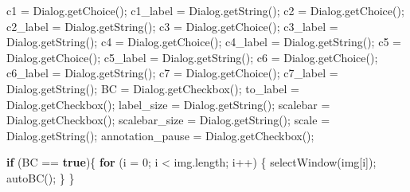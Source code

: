 \documentclass[
  12pt,
  a4paper,
]{book}
\newenvironment{Shaded}{}{}
\newcommand{\ControlFlowTok}[1]{\textcolor[rgb]{0.00,0.44,0.13}{\textbf{#1}}}
\newcommand{\DecValTok}[1]{\textcolor[rgb]{0.25,0.63,0.44}{#1}}
\newcommand{\KeywordTok}[1]{\textcolor[rgb]{0.00,0.44,0.13}{\textbf{#1}}}
\newcommand{\NormalTok}[1]{#1}
\newcommand{\OperatorTok}[1]{\textcolor[rgb]{0.40,0.40,0.40}{#1}}
\begin{document}
\begin{Shaded}
\begin{Highlighting}[]
\NormalTok{c1 }\OperatorTok{=}\NormalTok{ Dialog}\OperatorTok{.}\NormalTok{getChoice}\OperatorTok{();}
\NormalTok{c1\_label }\OperatorTok{=}\NormalTok{ Dialog}\OperatorTok{.}\NormalTok{getString}\OperatorTok{();}
\NormalTok{c2 }\OperatorTok{=}\NormalTok{ Dialog}\OperatorTok{.}\NormalTok{getChoice}\OperatorTok{();}
\NormalTok{c2\_label }\OperatorTok{=}\NormalTok{ Dialog}\OperatorTok{.}\NormalTok{getString}\OperatorTok{();}
\NormalTok{c3 }\OperatorTok{=}\NormalTok{ Dialog}\OperatorTok{.}\NormalTok{getChoice}\OperatorTok{();}
\NormalTok{c3\_label }\OperatorTok{=}\NormalTok{ Dialog}\OperatorTok{.}\NormalTok{getString}\OperatorTok{();}
\NormalTok{c4 }\OperatorTok{=}\NormalTok{ Dialog}\OperatorTok{.}\NormalTok{getChoice}\OperatorTok{();}
\NormalTok{c4\_label }\OperatorTok{=}\NormalTok{ Dialog}\OperatorTok{.}\NormalTok{getString}\OperatorTok{();}
\NormalTok{c5 }\OperatorTok{=}\NormalTok{ Dialog}\OperatorTok{.}\NormalTok{getChoice}\OperatorTok{();}
\NormalTok{c5\_label }\OperatorTok{=}\NormalTok{ Dialog}\OperatorTok{.}\NormalTok{getString}\OperatorTok{();}
\NormalTok{c6 }\OperatorTok{=}\NormalTok{ Dialog}\OperatorTok{.}\NormalTok{getChoice}\OperatorTok{();}
\NormalTok{c6\_label }\OperatorTok{=}\NormalTok{ Dialog}\OperatorTok{.}\NormalTok{getString}\OperatorTok{();}
\NormalTok{c7 }\OperatorTok{=}\NormalTok{ Dialog}\OperatorTok{.}\NormalTok{getChoice}\OperatorTok{();}
\NormalTok{c7\_label }\OperatorTok{=}\NormalTok{ Dialog}\OperatorTok{.}\NormalTok{getString}\OperatorTok{();}
\NormalTok{BC }\OperatorTok{=}\NormalTok{ Dialog}\OperatorTok{.}\NormalTok{getCheckbox}\OperatorTok{();}
\NormalTok{to\_label }\OperatorTok{=}\NormalTok{ Dialog}\OperatorTok{.}\NormalTok{getCheckbox}\OperatorTok{();}
\NormalTok{label\_size }\OperatorTok{=}\NormalTok{ Dialog}\OperatorTok{.}\NormalTok{getString}\OperatorTok{();}
\NormalTok{scalebar }\OperatorTok{=}\NormalTok{ Dialog}\OperatorTok{.}\NormalTok{getCheckbox}\OperatorTok{();}
\NormalTok{scalebar\_size }\OperatorTok{=}\NormalTok{ Dialog}\OperatorTok{.}\NormalTok{getString}\OperatorTok{();}
\NormalTok{scale }\OperatorTok{=}\NormalTok{ Dialog}\OperatorTok{.}\NormalTok{getString}\OperatorTok{();}
\NormalTok{annotation\_pause }\OperatorTok{=}\NormalTok{ Dialog}\OperatorTok{.}\NormalTok{getCheckbox}\OperatorTok{();}

\ControlFlowTok{if} \OperatorTok{(}\NormalTok{BC }\OperatorTok{==} \KeywordTok{true}\OperatorTok{)\{}
    \ControlFlowTok{for} \OperatorTok{(}\NormalTok{i }\OperatorTok{=} \DecValTok{0}\OperatorTok{;}\NormalTok{ i }\OperatorTok{\textless{}}\NormalTok{ img}\OperatorTok{.}\NormalTok{length}\OperatorTok{;}\NormalTok{ i}\OperatorTok{++)} \OperatorTok{\{}
\NormalTok{        selectWindow}\OperatorTok{(}\NormalTok{img}\OperatorTok{[}\NormalTok{i}\OperatorTok{]);}
\NormalTok{        autoBC}\OperatorTok{();}
    \OperatorTok{\}}
\OperatorTok{\}}




\end{Highlighting}
\end{Shaded}
\end{document}
